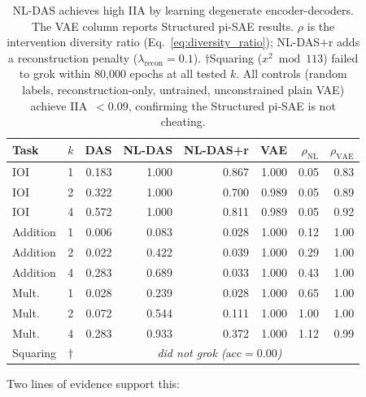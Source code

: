 \documentclass{article}
\begin{document}
\begin{table}[t]
\centering
\small
\setlength{\tabcolsep}{3pt}
\begin{tabular}{lc rrrr rr}
\toprule
Task & $k$ & DAS & NL-DAS & NL-DAS+r & VAE & $\rho_\text{NL}$ & $\rho_\text{VAE}$ \\
\midrule
IOI & 1 & 0.183 & 1.000 & 0.867 & 1.000 & 0.05 & 0.83 \\
IOI & 2 & 0.322 & 1.000 & 0.700 & 0.989 & 0.05 & 0.89 \\
IOI & 4 & 0.572 & 1.000 & 0.811 & 0.989 & 0.05 & 0.92 \\
\midrule
Addition & 1 & 0.006 & 0.083 & 0.028 & 1.000 & 0.12 & 1.00 \\
Addition & 2 & 0.022 & 0.422 & 0.039 & 1.000 & 0.29 & 1.00 \\
Addition & 4 & 0.283 & 0.689 & 0.033 & 1.000 & 0.43 & 1.00 \\
\midrule
Mult.\ & 1 & 0.028 & 0.239 & 0.028 & 1.000 & 0.65 & 1.00 \\
Mult.\ & 2 & 0.072 & 0.544 & 0.111 & 1.000 & 1.00 & 1.00 \\
Mult.\ & 4 & 0.283 & 0.933 & 0.372 & 1.000 & 1.12 & 0.99 \\
\midrule
Squaring & $\dagger$ & \multicolumn{6}{c}{\emph{did not grok ($\text{acc} = 0.00$)}} \\
\bottomrule
\end{tabular}
\caption{NL-DAS achieves high IIA by learning degenerate encoder-decoders.
  The VAE column reports Structured pi-SAE results.
  $\rho$ is the intervention diversity ratio (Eq.~\ref{eq:diversity_ratio});
  NL-DAS+r adds a reconstruction penalty ($\lambda_\text{recon} = 0.1$).
  $\dagger$Squaring ($x^2 \bmod 113$) failed to grok within 80{,}000 epochs
  at all tested $k$.
  All controls (random labels, reconstruction-only, untrained, unconstrained
  plain VAE) achieve IIA~$< 0.09$, confirming the Structured pi-SAE is not
  cheating.}
\label{tab:nldas_vacuous}
\end{table}

Two lines of evidence support this:
\end{document}
